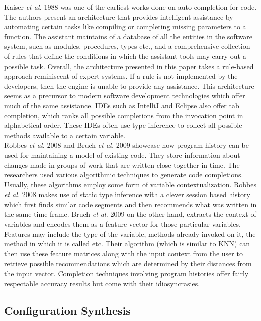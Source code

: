 Kaiser \textit{et al.} 1988 was one of the earliest works done on auto-completion for code. The authors present an architecture that provides intelligent assistance by automating certain tasks like compiling or completing missing parameters to a function. The assistant maintains of a database of all the entities in the software system, such as modules, procedures, types etc., and a comprehensive collection of rules that define the conditions in which the assistant tools may carry out a possible task. Overall, the architecture presented in this paper takes a rule-based approach reminiscent of expert systems. If a rule is not implemented by the developers, then the engine is unable to provide any assistance. This architecture seems as a precursor to modern software development technologies which offer much of the same assistance. IDEs such as IntelliJ and Eclipse also offer tab completion, which ranks all possible completions from the invocation point in alphabetical order. These IDEs often use type inference to collect all possible methods available to a certain variable. \\

Robbes \textit{et al.} 2008 and Bruch \textit{et al.} 2009 showcase how program history can be used for maintaining a model of existing code. They store information about changes made in groups of work that are written close together in time. The researchers used various algorithmic techniques to generate code completions. Usually, these algorithms employ some form of variable contextualization. Robbes \textit{et al.} 2008 makes use of static type inference with a clever session based history which first finds similar code segments and then recommends what was written in the same time frame. Bruch \textit{et al.} 2009 on the other hand, extracts the context of variables and encodes them as a feature vector for those particular variables. Features may include the type of the variable, methods already invoked on it, the method in which it is called etc. Their algorithm (which is similar to KNN) can then use these feature matrices along with the input context from the user to retrieve possible recommendations which are determined by their distances from the input vector.  Completion techniques involving program histories offer fairly respectable accuracy results but come with their idiosyncrasies.\\  

\subsection{Configuration Synthesis} 

